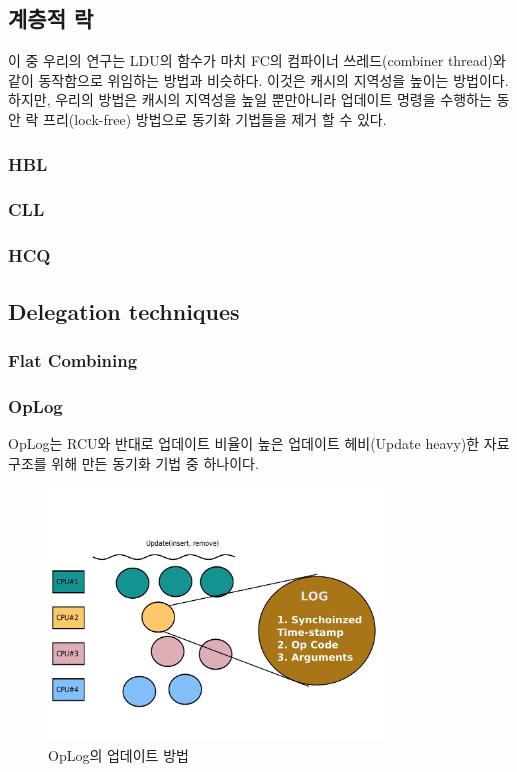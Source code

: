\subsection{계층적 락}

이 중 우리의 연구는 LDU의  함수가 마치 FC의 컴파이너 쓰레드(combiner thread)와 같이
동작함으로 위임하는 방법과 비슷하다. 이것은 캐시의 지역성을 높이는 방법이다.
하지만, 우리의 방법은 캐시의 지역성을 높일 뿐만아니라 업데이트 명령을
 수행하는 동안 락 프리(lock-free) 방법으로 동기화 기법들을 제거 할 수 있다. 
\subsubsection{HBL}



\subsubsection{CLL}


\subsubsection{HCQ}



\subsection{Delegation techniques}

\subsubsection{Flat Combining}



\subsubsection{OpLog}

OpLog는 RCU와 반대로 업데이트 비율이 높은 업데이트 헤비(Update heavy)한 자료구조를 위해 만든 
동기화 기법 중 하나이다.


\begin{figure}[h]
    \centering
    \includegraphics[width=0.8\textwidth]{fig/oplog_log}
    \caption{OpLog의 업데이트 방법}
  \label{fig:oplog}
\end{figure}



